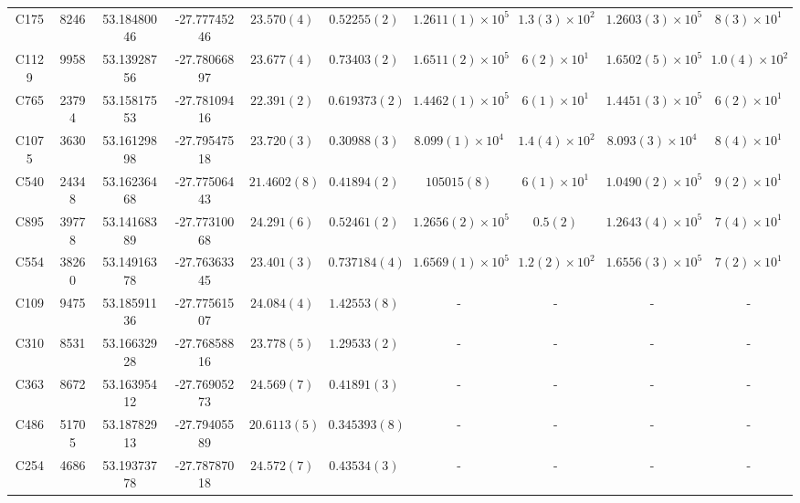 \documentclass[12pt, twocolumn]{revtex4-1}    %
\begin{document}
\begin{table}
\begin{tabular}{c@{\hskip 10pt}c@{\hskip 10pt}c@{\hskip 10pt}c@{\hskip 10pt}c@{\hskip 10pt}c@{\hskip 10pt}c@{\hskip 10pt}c@{\hskip 10pt}c@{\hskip 10pt}c}
C175 & 8246 & 53.18480046 & -27.77745246 & $23.570(4)$ & $0.52255(2)$ & $1.2611(1) \times 10^{5}$ & $1.3(3) \times 10^{2}$ & $1.2603(3) \times 10^{5}$ & $ 8(3) \times 10^{1}$ \\ 

C1129 & 9958 & 53.13928756 & -27.78066897 & $23.677(4)$ & $0.73403(2)$ & $1.6511(2) \times 10^{5}$ & $6(2) \times 10^{1}$ & $1.6502(5) \times 10^{5}$ & $ 1.0(4) \times 10^{2}$ \\ 

C765 & 23794 & 53.15817553 & -27.78109416 & $22.391(2)$ & $0.619373(2)$ & $1.4462(1) \times 10^{5}$ & $6(1) \times 10^{1}$ & $1.4451(3) \times 10^{5}$ & $ 6(2) \times 10^{1}$ \\ 

C1075 & 3630 & 53.16129898 & -27.79547518 & $23.720(3)$ & $0.30988(3)$ & $8.099(1) \times 10^{4}$ & $1.4(4) \times 10^{2}$ & $8.093(3) \times 10^{4}$ & $ 8(4) \times 10^{1}$ \\ 

C540 & 24348 & 53.16236468 & -27.77506443 & $21.4602(8)$ & $0.41894(2)$ & $105015(8)$ & $6(1) \times 10^{1}$ & $1.0490(2) \times 10^{5}$ & $ 9(2) \times 10^{1}$ \\ 

C895 & 39778 & 53.14168389 & -27.77310068 & $24.291(6)$ & $0.52461(2)$ & $1.2656(2) \times 10^{5}$ & $0.5(2)$ & $1.2643(4) \times 10^{5}$ & $ 7(4) \times 10^{1}$ \\ 

C554 & 38260 & 53.14916378 & -27.76363345 & $23.401(3)$ & $0.737184(4)$ & $1.6569(1) \times 10^{5}$ & $1.2(2) \times 10^{2}$ & $1.6556(3) \times 10^{5}$ & $ 7(2) \times 10^{1}$ \\ 

C109 & 9475 & 53.18591136 & -27.77561507 & $24.084(4)$ & $1.42553(8)$ & - & - & - & - \\ 

C310 & 8531 & 53.16632928 & -27.76858816 & $23.778(5)$ & $1.29533(2)$ & - & - & - & - \\ 

C363 & 8672 & 53.16395412 & -27.76905273 & $24.569(7)$ & $0.41891(3)$ & - & - & - & - \\ 

C486 & 51705 & 53.18782913 & -27.79405589 & $20.6113(5)$ & $0.345393(8)$ & - & - & - & - \\ 

C254 & 4686 & 53.19373778 & -27.78787018 & $24.572(7)$ & $0.43534(3)$ & - & - & - & - \\ 


\end{tabular}
\end{table}
\end{document}
